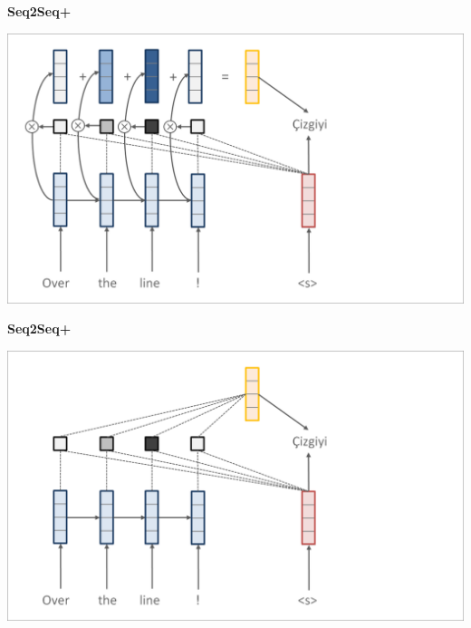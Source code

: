 \documentclass[aspectratio=169,12pt]{beamer}
\newcommand{\air}{\vspace{0.25cm}}
\begin{document}
\begin{frame}
  \begin{center}
    \textbf{Seq2Seq+} \air

  \end{center}
\center
\vspace{-5mm}
 \air
\includegraphics[scale=0.37]{nmt-attn6}
\end{frame}
\begin{frame}
  \begin{center}
    \textbf{Seq2Seq+} \air

  \end{center}
\center
\vspace{-5mm}
 \air
\includegraphics[scale=0.37]{nmt-attn7}
\end{frame}
\end{document}
